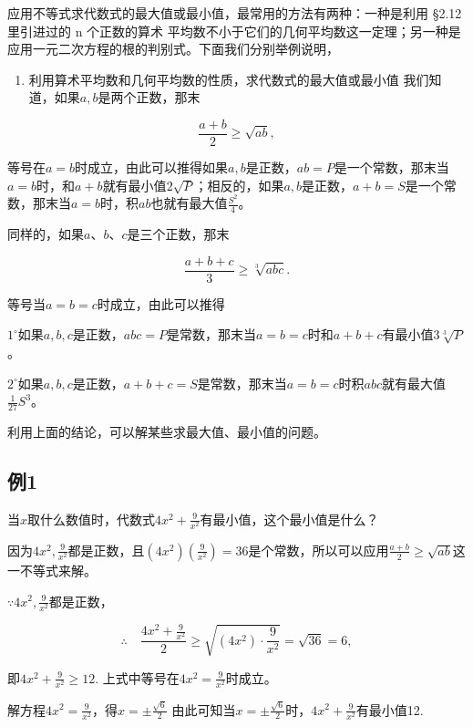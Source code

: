 应用不等式求代数式的最大值或最小值，最常用的方法有两种：一种是利用 §2.12
里引进过的 n 个正数的算术
平均数不小于它们的几何平均数这一定理；另一种是应用一元二次方程的根的判别式。下面我们分别举例说明，

\begin{enumerate}
\item
  利用算术平均数和几何平均数的性质，求代数式的最大值或最小值
  我们知道，如果\(a, b\)是两个正数，那末
\end{enumerate}

\[
\frac{a + b}{2} \geqslant \sqrt{a b},
\]

等号在\(a=b\)时成立，由此可以推得如果\(a, b\)是正数，\(ab = P\)是一个常数，那末当\(a=b\)时，和\(a + b\)就有最小值\(2\sqrt{P}\)；相反的，如果\(a, b\)是正数，\(a + b = S\)是一个常数，那末当\(a=b\)时，积\(ab\)也就有最大值\(\frac{S^2}{4}\)。

同样的，如果\(a \text{、} b \text{、} c\)是三个正数，那末

\[
\frac{a + b + c}{3} \geqslant \sqrt[3]{a b c}.
\]

等号当\(a = b = c\)时成立，由此可以推得

\(1^{\circ}\)如果\(a, b, c\)是正数，\(abc = P\)是常数，那末当\(a = b = c\)时和\(a + b + c\)有最小值\(3\sqrt[3]{P}\)。

\(2^{\circ}\)如果\(a, b, c\)是正数，\(a + b + c = S\)是常数，那末当\(a = b = c\)时积\(abc\)就有最大值\(\frac{1}{27} S^{3}\)。

利用上面的结论，可以解某些求最大值、最小值的问题。

\subsection{例1}

当\(x\)取什么数值时，代数式\(4x^{2} + \frac{9}{x^{2}}\)有最小值，这个最小值是什么？

因为\(4x^{2}, \frac{9}{x^{2}}\)都是正数，且\((4x^{2})\left(\frac{9}{x^{2}}\right) = 36\)是个常数，所以可以应用\(\frac{a + b}{2} \geqslant \sqrt{ab}\)这一不等式来解。

 \(\because 4x^{2}, \frac{9}{x^{2}}\)都是正数，

\[
\therefore \quad \frac{4 x^{2} + \frac{9}{x^2}}{2} \geqslant \sqrt{(4x^2)\cdot\frac{9}{x^2}} = \sqrt{36} = 6,
\]

即\(4x^{2} + \frac{9}{x^{2}}\geqslant 12.\)
上式中等号在\(4x^{2} = \frac{9}{x^{2}}\)时成立。

解方程\(4x^{2} = \frac{9}{x^{2}}\)，得\(x = \pm \frac{\sqrt{6}}{2}\)
由此可知当\(x = \pm \frac{\sqrt{6}}{2}\)时，\(4x^2 + \frac{9}{x^2}\)有最小值12.

